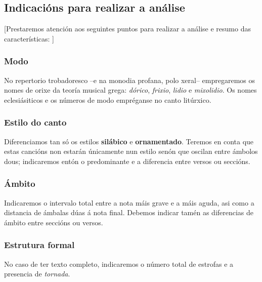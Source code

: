 \subsection*{Indicacións para realizar a análise}
%
\begin{multicols}{2}
%
[Prestaremos atención aos seguintes puntos para realizar a análise e resumo das características:
]
\subsubsection*{Modo}

No repertorio trobadoresco --e na monodia profana, polo xeral-- empregaremos os nomes de orixe da teoría musical grega: \textit{dórico}, \textit{frixio}, \textit{lidio} e \textit{mixolidio}. Os nomes eclesiásiticos e os números de modo empréganse no canto litúrxico.

\subsubsection*{Estilo do canto}

Diferenciamos tan só os estilos \textbf{silábico} e \textbf{ornamentado}. Teremos en conta que estas cancións non estarán únicamente nun estilo senón que oscilan entre ámbolos dous; indicaremos entón o predominante e a diferencia entre versos ou seccións.

\subsubsection*{Ámbito}

Indicaremos o intervalo total entre a nota máis grave e a máis aguda, asi como a distancia de ámbalas dúas á nota final. Debemos indicar tamén as diferencias de ámbito entre seccións ou versos.

\subsubsection*{Estrutura formal}

No caso de ter texto completo, indicaremos o número total de estrofas e a presencia de \textit{tornada}.


\end{multicols}
